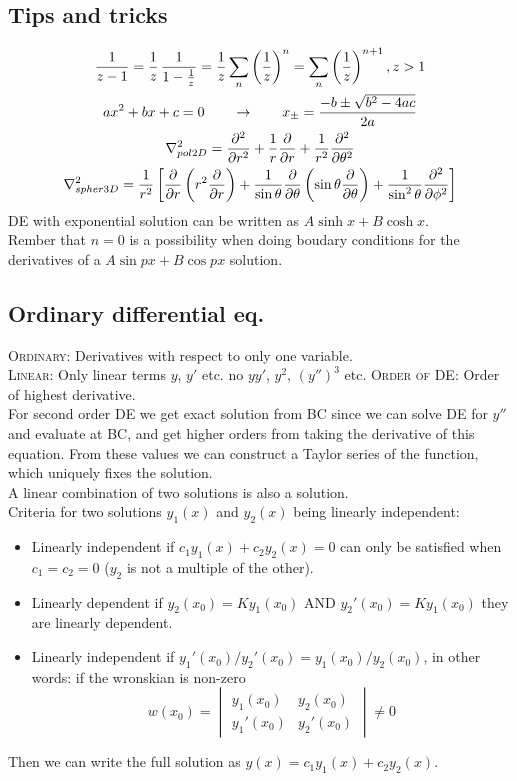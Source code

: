\documentclass[a4paper, 10pt]{article}
\begin{document}
\begin{multicols*}{3}
\begin{mdframed}
\subsection*{Tips and tricks}
\end{mdframed}
\begin{multline*}
  \frac{1}{z-1} = \frac{1}{z}\,\frac{1}{1-\frac{1}{z}} = \frac{1}{z}\sum_n\left(\frac{1}{z}\right)^n = \sum_n\left(\frac{1}{z}\right)^{n+1}, z>1 \\
  ax^2 + bx + c = 0 \qquad \rightarrow \qquad x_{\pm} = \frac{-b \pm \sqrt{b^2 - 4ac}}{2a} \\
  \nabla^2_{pol2D} = \pdv[2]{}{r} + \frac{1}{r}\pdv{}{r} + \frac{1}{r^2}\pdv[2]{}{\theta}\\
  \nabla^2_{spher3D} = \frac{1}{r^2}\left[ \pdv{}{r}\left( r^2\pdv{}{r} \right) + \frac{1}{\sin{\theta}}\pdv{}{\theta}\left( \sin{\theta}\pdv{}{\theta}\right) + \frac{1}{\sin^2{\theta}}\pdv[2]{}{\phi}\right]
\end{multline*}
DE with exponential solution can be written as $A\sinh{x} + B\cosh{x}$.\\
Rember that $n=0$ is a possibility when doing boudary conditions for the derivatives of a $A\sin{px} + B\cos{px}$ solution.
\newpage


\begin{mdframed}
\subsection*{Ordinary differential eq.}
\end{mdframed}
\textsc{Ordinary:} Derivatives with respect to only one variable.\\
\textsc{Linear:} Only linear terms $y$, $y'$ etc. no $yy'$, $y^2$, $(y'')^3$ etc.
\textsc{Order of DE:} Order of highest derivative.\\
For second order DE we get exact solution from BC since we can solve DE for $y''$ and evaluate at BC, and get higher orders from taking the derivative of this equation. From these values we can construct a Taylor series of the function, which uniquely fixes the solution.\\
A linear combination of two solutions is also a solution.\\
Criteria for two solutions $y_1(x)$ and $y_2(x)$ being linearly independent:
\begin{itemize}
  \item Linearly independent if $c_1y_1(x) + c_2y_2(x) = 0$ can only be satisfied when $c_1 = c_2=0$ ($y_2$ is not a multiple of the other).
  \item Linearly dependent if $y_2(x_0) = Ky_1(x_0)$ AND $y_2'(x_0) = Ky_1(x_0)$ they are linearly dependent.
  \item Linearly independent if $y_1'(x_0)/y_2'(x_0) = y_1(x_0)/y_2(x_0)$, in other words: if the wronskian is non-zero $$ w(x_0) = \begin{vmatrix}
  y_1(x_0)  & y_2(x_0)\\
  y_1'(x_0) & y_2'(x_0)
  \end{vmatrix} \neq 0$$
\end{itemize}
Then we can write the full solution as $y(x)=c_1y_1(x) + c_2y_2(x)$.

\end{multicols*}
\end{document}
